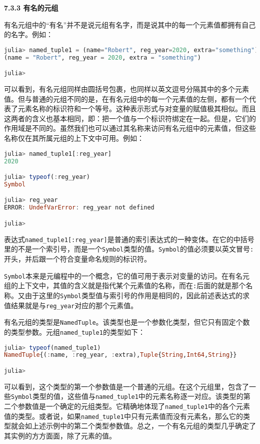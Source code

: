 \textbf{7.3.3 有名的元组}

有名元组中的“有名”并不是说元组有名字，而是说其中的每一个元素值都拥有自己的名字。例如：
\begin{lstlisting}[language=julia]
julia> named_tuple1 = (name="Robert", reg_year=2020, extra="something")
(name = "Robert", reg_year = 2020, extra = "something")

julia> 
\end{lstlisting}

可以看到，有名元组同样由圆括号包裹，也同样以英文逗号分隔其中的多个元素值。但与普通的元组不同的是，在有名元组中的每一个元素值的左侧，都有一个代表了元素名称的标识符和一个等号。这种表示形式与对变量的赋值极其相似。而且这两者的含义也基本相同，即：把一个值与一个标识符绑定在一起。但是，它们的作用域是不同的。虽然我们也可以通过其名称来访问有名元组中的元素值，但这些名称仅在其所属元组的上下文中可用。例如：
\begin{lstlisting}[language=julia]
julia> named_tuple1[:reg_year]
2020

julia> typeof(:reg_year)
Symbol

julia> reg_year
ERROR: UndefVarError: reg_year not defined

julia> 
\end{lstlisting}

表达式\verb|named_tuple1[:reg_year]|是普通的索引表达式的一种变体。在它的中括号里的不是一个索引号，而是一个\verb|Symbol|类型的值。\verb|Symbol|的值必须要以英文冒号\verb|:|开头，并后跟一个符合变量命名规则的标识符。

\verb|Symbol|本来是元编程中的一个概念，它的值可用于表示对变量的访问。在有名元组的上下文中，其值的含义就是指代某个元素值的名称，而在\verb|:|后面的就是那个名称。又由于这里的\verb|Symbol|类型值与索引号的作用是相同的，因此前述表达式的求值结果就是与\verb|reg_year|对应的那个元素值。

有名元组的类型是\verb|NamedTuple|。该类型也是一个参数化类型，但它只有固定个数的类型参数。元组\verb|named_tuple1|的类型如下：
\begin{lstlisting}[language=julia]
julia> typeof(named_tuple1)
NamedTuple{(:name, :reg_year, :extra),Tuple{String,Int64,String}}

julia> 
\end{lstlisting}

可以看到，这个类型的第一个参数值是一个普通的元组。在这个元组里，包含了一些\verb|Symbol|类型的值，这些值与\verb|named_tuple1|中的元素名称逐一对应。该类型的第二个参数值是一个确定的元组类型。它精确地体现了\verb|named_tuple1|中的各个元素值的类型。或者说，如果\verb|named_tuple1|中只有元素值而没有元素名，那么它的类型就会如上述示例中的第二个类型参数值。总之，一个有名元组的类型几乎确定了其实例的方方面面，除了元素的值。

